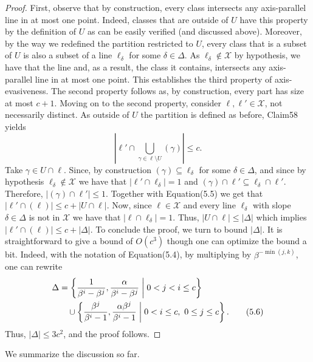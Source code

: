 \begin{proof}
First, observe that by construction, every class intersects any axis-parallel line in at most one point. Indeed, classes that are outside of $U$ have this property by the definition of $U$ as can be easily verified (and discussed above). Moreover, by the way we redefined the partition restricted to $U$, every class that is a subset of $U$ is also a subset of a line $\ell_\delta$ for some $\delta\in\Delta$. As $\ell_\delta\notin\mathcal X$ by hypothesis, we have that the line and, as a result, the class it contains, intersects any axis-parallel line in at most one point. This establishes the third property of axis-evasiveness. The second property follows as, by construction, every part has size at most $c+1$.
Moving on to the second property, consider $\ell,\ell'\in\mathcal X$, not necessarily distinct. As outside of $U$ the partition is defined as before, Claim58 yields
\begin{equation}\left|\ell'\cap\bigcup_{\gamma\in\ell\setminus U}(\gamma)\right|\leq c.\tag{5.5}\end{equation}
Take $\gamma\in U\cap\ell$. Since, by construction $(\gamma)\subseteq\ell_\delta$ for some $\delta\in\Delta$, and since by hypothesis $\ell_\delta\notin\mathcal X$ we have that $|\ell'\cap\ell_\delta|=1$ and $(\gamma)\cap\ell'\subseteq\ell_\delta\cap\ell'$. Therefore, $|(\gamma)\cap\ell'|\leq1$. Together with Equation(5.5) we get that $|\ell'\cap(\ell)|\leq c+|U\cap\ell|$. Now, since $\ell\in\mathcal X$ and every line $\ell_\delta$ with slope $\delta\in\Delta$ is not in $\mathcal X$ we have that $|\ell\cap\ell_\delta|=1$. Thus, $|U\cap\ell|\leq|\Delta|$ which implies $|\ell'\cap(\ell)|\leq c+|\Delta|$.
To conclude the proof, we turn to bound $|\Delta|$. It is straightforward to give a bound of $O(c^3)$ though one can optimize the bound a bit. Indeed, with the notation of Equation(5.4), by multiplying by $\beta^{-\min(j,k)}$, one can rewrite
\begin{align}\Delta&=\left\{\frac1{\beta^i-\beta^j},\frac\alpha{\beta^i-\beta^j}\;\middle|\;0<j<i\leq c\right\}\notag\\&\quad\cup\left\{\frac{\beta^j}{\beta^i-1},\frac{\alpha\beta^j}{\beta^i-1}\;\middle|\;0<i\leq c,\ 0\leq j\leq c\right\}.\tag{5.6}\end{align}
Thus, $|\Delta|\leq3c^2$, and the proof follows.
\end{proof}
We summarize the discussion so far.
